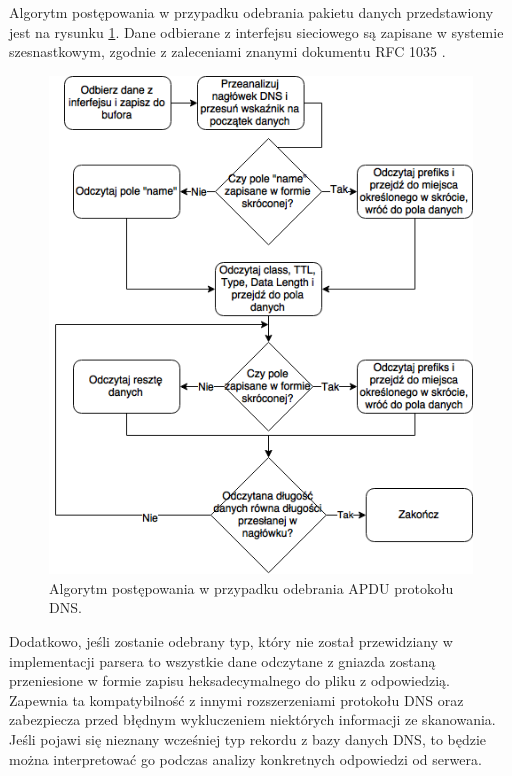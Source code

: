 Algorytm postępowania w przypadku odebrania pakietu danych przedstawiony jest na rysunku \ref{fig:receiving}. Dane odbierane z interfejsu
sieciowego są zapisane w systemie szesnastkowym, zgodnie z zaleceniami znanymi dokumentu RFC 1035 \cite{RFC1035}.

\begin{figure}[h]
	\centering
	\includegraphics[width=1.0\textwidth]{image/receiving}
	\caption{Algorytm postępowania w przypadku odebrania APDU protokołu DNS.}
	\label{fig:receiving}
\end{figure}

Dodatkowo, jeśli zostanie odebrany typ, który nie został przewidziany w implementacji parsera to wszystkie dane odczytane z
gniazda zostaną przeniesione w formie zapisu heksadecymalnego do pliku z odpowiedzią. Zapewnia ta kompatybilność z innymi
rozszerzeniami protokołu DNS oraz zabezpiecza przed błędnym wykluczeniem niektórych informacji ze skanowania. Jeśli pojawi
się nieznany wcześniej typ rekordu z bazy danych DNS, to będzie można interpretować go podczas analizy konkretnych odpowiedzi
od serwera.


